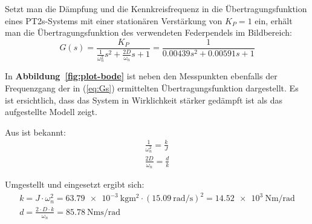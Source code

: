 \documentclass[a4paper,12pt]{scrartcl}
\begin{document}
Setzt man die Dämpfung und die Kennkreisfrequenz in die Übertragungsfunktion eines PT2s-Systems mit einer stationären Verstärkung von $K_{P} = 1$ ein, erhält man die Übertragungsfunktion des verwendeten Federpendels im Bildbereich:
\begin{equation}
	\label{eq:Gs}
	G \left( s \right) = \frac{K_{P}}{\frac{1}{\omega_{n}^{2}} s^{2} + \frac{2 D}{\omega_{n}} s + 1} = \frac{1}{0.00439 s^{2} + 0.00591 s + 1}
\end{equation}

In \textbf{Abbildung~\ref{fig:plot-bode}} ist neben den Messpunkten ebenfalls der Frequenzgang der in (\ref{eq:Gs}) ermittelten Übertragungsfunktion dargestellt.
Es ist ersichtlich, dass das System in Wirklichkeit stärker gedämpft ist als das aufgestellte Modell zeigt. 

Aus \cite{skript} ist bekannt:
\begin{gather}
	\frac{1}{\omega_{n}^{2}} = \frac{k}{J} \\
	\frac{2 D}{\omega_{n}} = \frac{d}{k}
\end{gather}

Umgestellt und eingesetzt ergibt sich: 
\begin{gather}
	k = J \cdot \omega_{n}^{2} = \SI{63.79e-3}{\kilogram\square\metre} \cdot \left( \SI{15.09}{\radian\per\second} \right)^{2} = \SI{14.52e3}{\newton\metre\per\radian}\\
	d = \frac{2 \cdot D \cdot k}{\omega_{n}} = \SI{85.78}{\newton\metre\second\per\radian}
\end{gather}
\end{document}
